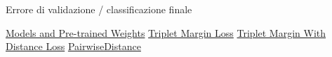 \documentclass[11pt]{article}
\begin{document}
Errore di validazione / classificazione finale


\pagebreak

\begin{thebibliography}{4}

 \href{https://pytorch.org/vision/stable/models.html}{Models and Pre-trained Weights}
 \href{
    https://pytorch.org/docs/stable/generated/torch.nn.TripletMarginLoss.html
}{Triplet Margin Loss}
 \href{
    https://pytorch.org/docs/stable/generated/torch.nn.TripletMarginWithDistanceLoss.html#torch.nn.TripletMarginWithDistanceLoss
}{Triplet Margin With Distance Loss}
 \href{
    https://pytorch.org/docs/stable/generated/torch.nn.PairwiseDistance.html
}{PairwiseDistance}



\end{thebibliography}


\pagebreak
\end{document}

